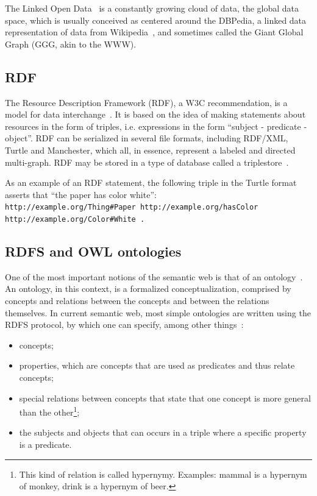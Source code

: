 \documentclass[review]{elsarticle}
\begin{document}
The Linked Open Data~\cite{lod} is a constantly growing cloud of data,
the global data space, which is usually
conceived as centered around the DBPedia, a linked data representation
of data from Wikipedia~\cite{dbpedia0,dbpedia},
and sometimes called the Giant Global Graph (GGG, akin to the WWW).

\subsection{RDF}
The Resource Description Framework (RDF), a W3C
recommendation, is a model for data
interchange~\cite{w3cr}.
It is based on the idea of making statements about resources in the form
of triples, i.e. expressions in the form ``subject - predicate -
object''.
RDF can be serialized in several file formats, including RDF/XML,
Turtle and Manchester, which all, in essence, represent a labeled and
directed multi-graph.
RDF may be stored in a type of database called a triplestore~\cite{rdf}.

As an example of an RDF statement, the following triple in the Turtle
format asserts that ``the paper has color white'':\\
\texttt{http://example.org/Thing\#Paper http://example.org/hasColor\\
http://example.org/Color\#White .}

\subsection{RDFS and OWL ontologies}\label{sont}
One of the most important notions of the semantic web is that of an ontology~\cite{ont}.
An ontology, in this context, is a formalized conceptualization, comprised by
concepts and relations between the concepts and between the relations themselves.
In current semantic web, most simple ontologies are written using the RDFS protocol,
by which one can specify, among other things~\cite{rdfs}:
\begin{itemize}
  \item concepts;
  \item properties, which are concepts that are used as predicates and thus relate concepts;
  \item special relations between concepts that state that one concept is more general than the other\footnote{This
          kind of relation is called hypernymy. Examples: mammal is a hypernym of monkey, drink is a hypernym of beer.};
  \item the subjects and objects that can occurs in a triple where a specific property is a predicate.
\end{itemize}
\end{document}
